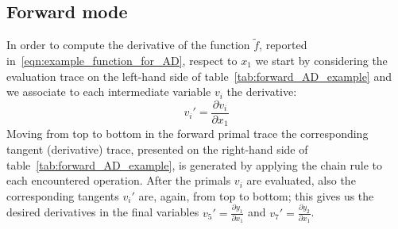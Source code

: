 


\subsection{Forward mode}
\label{subsec:forward_mode_AD}

In order to compute the derivative of the function $\tilde{f}$, reported in~\eqref{eqn:example_function_for_AD}, respect to $x_1$ we start by considering the evaluation trace on the left-hand side of table~\ref{tab:forward_AD_example} and we associate to each intermediate variable $ v_i$ the derivative:
\[
	v_i' = \frac{\partial v_i}{\partial x_1}
\]
Moving from top to bottom in the forward primal trace the corresponding tangent (derivative) trace, presented on the right-hand side of table~\ref{tab:forward_AD_example}, is generated by applying the chain rule to each encountered operation. After the primals $v_i$ are evaluated, also the corresponding tangents $v_i'$ are, again, from top to bottom; this gives us the desired derivatives in the final variables $v_5' = \frac{\partial y_1}{\partial x_1}$ and $v_7' = \frac{\partial y_2}{\partial x_1}$.

